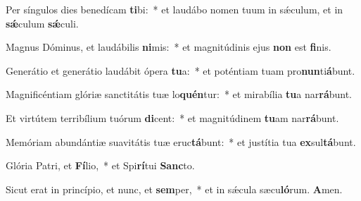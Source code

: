 ﻿\item Per síngulos dies benedícam \textbf{ti}bi:~* et laudábo nomen tuum in sǽculum, et in \textbf{sǽ}culum \textbf{sǽ}culi.

\item Magnus Dóminus, et laudábilis \textbf{ni}mis:~* et magnitúdinis ejus \textbf{non} est \textbf{fi}nis.

\item Generátio et generátio laudábit ópera \textbf{tu}a:~* et poténtiam tuam pro\textbf{nun}ti\textbf{á}bunt.

\item Magnificéntiam glóriæ sanctitátis tuæ lo\textbf{quén}tur:~* et mirabília \textbf{tu}a nar\textbf{rá}bunt.

\item Et virtútem terribílium tuórum \textbf{di}cent:~* et mag\-ni\-tú\-di\-nem \textbf{tu}am nar\textbf{rá}bunt.

\item Memóriam abundántiæ suavitátis tuæ eruc\textbf{tá}bunt:~* et justítia tua \textbf{ex}sul\textbf{tá}bunt.

\item Glória Patri, et \textbf{Fí}lio,~* et Spi\textbf{rí}tui \textbf{Sanc}to.

\item Sicut erat in princípio, et nunc, et \textbf{sem}per,~* et in sǽcula sæcu\textbf{ló}rum. \textbf{A}men.